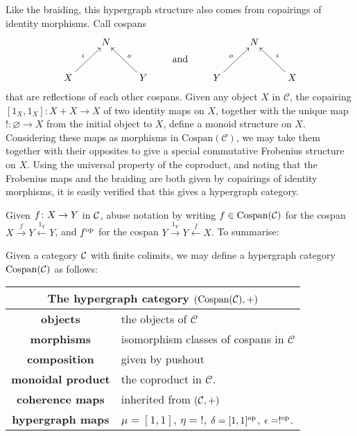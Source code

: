 Like the braiding, this hypergraph structure also comes from copairings of
identity morphisms.  Call cospans 
\[
  \xymatrix{
    & N \\
    X \ar[ur]^{i} && Y \ar[ul]_{o}
  }
  \qquad \xymatrix@R=8pt{\\\textrm{and}} \qquad 
  \xymatrix{
    & N \\
    Y \ar[ur]^{o} && X \ar[ul]_{i}
  }
\]
that are reflections of each other  cospans. Given any object
$X$ in $\mathcal C$, the copairing $[1_X,1_X]\colon  X + X \to X$ of two identity
maps on $X$, together with the unique map $!\colon  \varnothing \to X$ from the
initial object to $X$, define a monoid structure on $X$. Considering these
maps as morphisms in $\mathrm{Cospan(\mathcal C)}$, we may take them together
with their opposites to give a special commutative Frobenius structure on $X$.
Using the universal property of the coproduct, and noting that the Frobenius
maps and the braiding are both given by copairings of identity morphisms, it is
easily verified that this gives a hypergraph category.

Given $f {\colon} X \to Y$ in $\mathcal C$, abuse notation by writing $f \in
\mathrm{Cospan}(\mathcal C)$ for the cospan $X \stackrel{f}\to Y
\stackrel{1_Y}\leftarrow Y$, and $f^{\mathrm{op}}$ for the cospan $Y \stackrel{1_Y}\to Y
\stackrel{f}\leftarrow X$. To summarise:

\begin{proposition}
  Given a category $\mathcal C$ with finite colimits, we may define a hypergraph
  category $\operatorname{{Cospan}}(\mathcal C)$ as follows:
\smallskip 

  \begin{center}
  \begin{tabular}{ |c| p{}|}
      \hline
      \multicolumn{2}{|c|}{The hypergraph category $(\mathrm{Cospan(\mathcal C)},+)$} \\
    \hline
    \textbf{objects} & the objects of $\mathcal C$ \\ 
    \textbf{morphisms} & isomorphism classes of cospans in
    $\mathcal C$\\ 
  \textbf{composition} & given by pushout \\
  \textbf{monoidal product} & the coproduct in $\mathcal C$. \\
  \textbf{coherence maps} & inherited from $(\mathcal C,+)$\\
  \textbf{hypergraph maps} & $\mu = [1,1]$, $\eta = !$,
  $\delta = [1,1]^{\mathrm{op}}$, $\epsilon = !^{\mathrm{op}}$. \\
      \hline
  \end{tabular}
\end{center}
\smallskip
\end{proposition}

